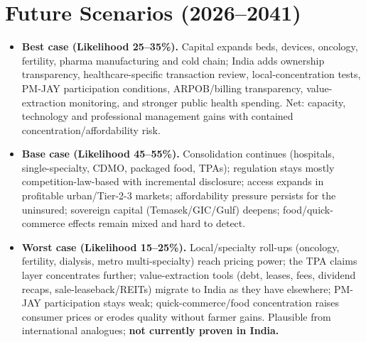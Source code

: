 \documentclass[11pt,a4paper]{article}
\begin{document}
\section{Future Scenarios (2026--2041)}\label{sec:scenarios}
\begin{itemize}[leftmargin=1.4em,itemsep=3pt]
\item \textbf{Best case (Likelihood 25--35\%).} Capital expands beds, devices, oncology, fertility, pharma manufacturing and cold chain; India adds ownership transparency, healthcare-specific transaction review, local-concentration tests, PM-JAY participation conditions, ARPOB/billing transparency, value-extraction monitoring, and stronger public health spending. Net: capacity, technology and professional management gains with contained concentration/affordability risk.
\item \textbf{Base case (Likelihood 45--55\%).} Consolidation continues (hospitals, single-specialty, CDMO, packaged food, TPAs); regulation stays mostly competition-law-based with incremental disclosure; access expands in profitable urban/Tier-2-3 markets; affordability pressure persists for the uninsured; sovereign capital (Temasek/GIC/Gulf) deepens; food/quick-commerce effects remain mixed and hard to detect.
\item \textbf{Worst case (Likelihood 15--25\%).} Local/specialty roll-ups (oncology, fertility, dialysis, metro multi-specialty) reach pricing power; the TPA claims layer concentrates further; value-extraction tools (debt, leases, fees, dividend recaps, sale-leaseback/REITs) migrate to India as they have elsewhere; PM-JAY participation stays weak; quick-commerce/food concentration raises consumer prices or erodes quality without farmer gains. Plausible from international analogues; \textbf{not currently proven in India.}
\end{itemize}

\end{document}
